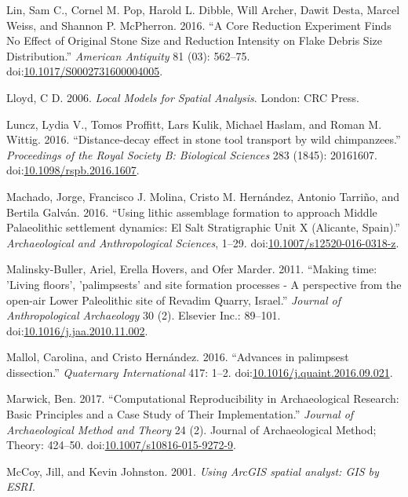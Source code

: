 \documentclass[smallextended]{svjour3}       %
\begin{document}
\hypertarget{ref-Lin2016}{}
Lin, Sam C., Cornel M. Pop, Harold L. Dibble, Will Archer, Dawit Desta,
Marcel Weiss, and Shannon P. McPherron. 2016. ``A Core Reduction
Experiment Finds No Effect of Original Stone Size and Reduction
Intensity on Flake Debris Size Distribution.'' \emph{American Antiquity}
81 (03): 562--75.
doi:\href{https://doi.org/10.1017/S0002731600004005}{10.1017/S0002731600004005}.

\hypertarget{ref-Lloyd2006}{}
Lloyd, C D. 2006. \emph{Local Models for Spatial Analysis}. London: CRC
Press.

\hypertarget{ref-Luncz2016}{}
Luncz, Lydia V., Tomos Proffitt, Lars Kulik, Michael Haslam, and Roman
M. Wittig. 2016. ``Distance-decay effect in stone tool transport by wild
chimpanzees.'' \emph{Proceedings of the Royal Society B: Biological
Sciences} 283 (1845): 20161607.
doi:\href{https://doi.org/10.1098/rspb.2016.1607}{10.1098/rspb.2016.1607}.

\hypertarget{ref-Machado2016}{}
Machado, Jorge, Francisco J. Molina, Cristo M. Hernández, Antonio
Tarriño, and Bertila Galván. 2016. ``Using lithic assemblage formation
to approach Middle Palaeolithic settlement dynamics: El Salt
Stratigraphic Unit X (Alicante, Spain).'' \emph{Archaeological and
Anthropological Sciences}, 1--29.
doi:\href{https://doi.org/10.1007/s12520-016-0318-z}{10.1007/s12520-016-0318-z}.

\hypertarget{ref-Malinsky-Buller2011}{}
Malinsky-Buller, Ariel, Erella Hovers, and Ofer Marder. 2011. ``Making
time: 'Living floors', 'palimpsests' and site formation processes - A
perspective from the open-air Lower Paleolithic site of Revadim Quarry,
Israel.'' \emph{Journal of Anthropological Archaeology} 30 (2). Elsevier
Inc.: 89--101.
doi:\href{https://doi.org/10.1016/j.jaa.2010.11.002}{10.1016/j.jaa.2010.11.002}.

\hypertarget{ref-Mallol2016}{}
Mallol, Carolina, and Cristo Hernández. 2016. ``Advances in palimpsest
dissection.'' \emph{Quaternary International} 417: 1--2.
doi:\href{https://doi.org/10.1016/j.quaint.2016.09.021}{10.1016/j.quaint.2016.09.021}.

\hypertarget{ref-Marwick2017}{}
Marwick, Ben. 2017. ``Computational Reproducibility in Archaeological
Research: Basic Principles and a Case Study of Their Implementation.''
\emph{Journal of Archaeological Method and Theory} 24 (2). Journal of
Archaeological Method; Theory: 424--50.
doi:\href{https://doi.org/10.1007/s10816-015-9272-9}{10.1007/s10816-015-9272-9}.

\hypertarget{ref-McCoy2001}{}
McCoy, Jill, and Kevin Johnston. 2001. \emph{Using ArcGIS spatial
analyst: GIS by ESRI}.
\end{document}
